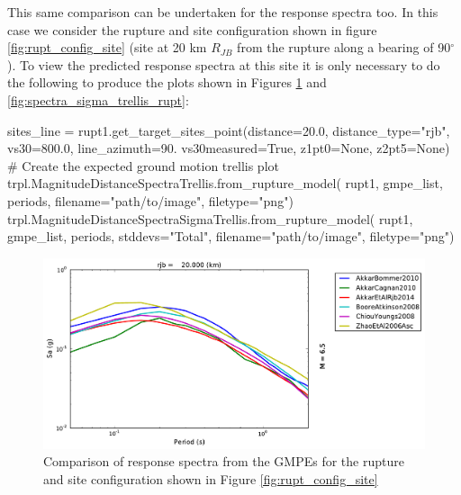 This same comparison can be undertaken for the response spectra too. In this case we consider the rupture and site configuration shown in figure \ref{fig:rupt_config_site} (site at 20 km $R_{JB}$ from the rupture along a bearing of 90$^{\circ}$). To view the predicted response spectra at this site it is only necessary to do the following to produce the plots shown in Figures \ref{fig:spectra_trellis_rupt} and \ref{fig:spectra_sigma_trellis_rupt}:

\begin{python}
sites_line = rupt1.get_target_sites_point(distance=20.0,
                                          distance_type="rjb",
                                          vs30=800.0,
                                          line_azimuth=90.
                                          vs30measured=True,
                                          z1pt0=None,
                                          z2pt5=None)
# Create the expected ground motion trellis plot
trpl.MagnitudeDistanceSpectraTrellis.from_rupture_model(
    rupt1,
    gmpe_list,
    periods, 
    filename="path/to/image",
    filetype="png")
trpl.MagnitudeDistanceSpectraSigmaTrellis.from_rupture_model(
    rupt1,
    gmpe_list,
    periods,
    stddevs="Total",
    filename="path/to/image",
    filetype="png") 
\end{python}

\begin{figure}[htb]
	\centering
		\includegraphics[width=\textwidth]{./figures/trellis/spectra_trellis_rupt.pdf}
	\caption{Comparison of response spectra from the GMPEs for the rupture and site configuration shown in Figure \ref{fig:rupt_config_site}}
	\label{fig:spectra_trellis_rupt}
\end{figure}

